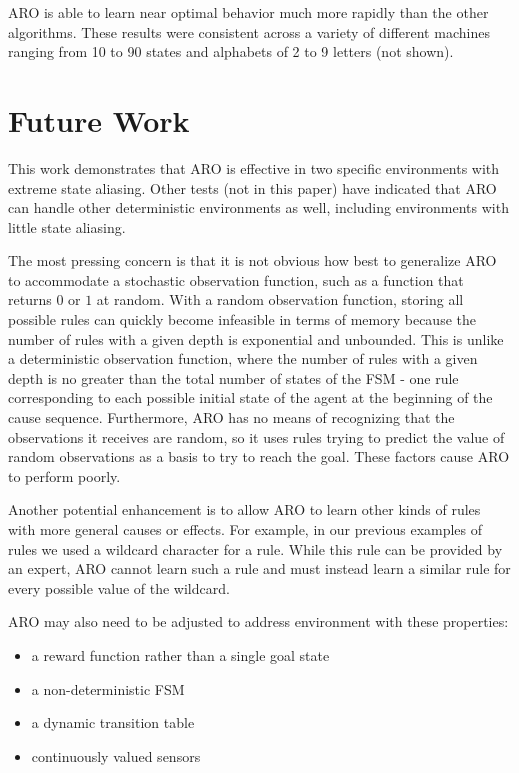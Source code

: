 \documentclass[letterpaper]{article} %
\begin{document}
ARO is able to learn near optimal behavior much more rapidly than the
other algorithms.  These results were consistent across a variety of
different machines ranging from 10 to 90 states and alphabets of 2 to
9 letters (not shown).

\section{Future Work}

This work demonstrates that ARO is effective in two specific
environments with extreme state aliasing. Other tests (not in this
paper) have indicated that ARO can handle other deterministic
environments as well, including environments with little state
aliasing.

The most pressing concern is that it is not obvious how best to
generalize ARO to accommodate a stochastic observation function, such
as a function that returns $0$ or $1$ at random. With a random
observation function, storing all possible rules can quickly become
infeasible in terms of memory because the number of rules with a given
depth is exponential and unbounded. This is unlike a deterministic
observation function, where the number of rules with a given depth is
no greater than the total number of states of the FSM - one rule
corresponding to each possible initial state of the agent at the
beginning of the cause sequence. Furthermore, ARO has no means of
recognizing that the observations it receives are random, so it uses
rules trying to predict the value of random observations as a basis to
try to reach the goal. These factors cause ARO to perform poorly.

Another potential enhancement is to allow ARO to learn other kinds of
rules with more general causes or effects. For example, in our
previous examples of rules we used a wildcard character for a
rule. While this rule can be provided by an expert, ARO cannot learn
such a rule and must instead learn a similar rule for every possible
value of the wildcard.

ARO may also need to be adjusted to address environment with these
properties:
\begin{itemize}
\item a reward function rather than a single goal state
\item a non-deterministic FSM
\item a dynamic transition table
\item continuously valued sensors
\end{itemize}
\end{document}
